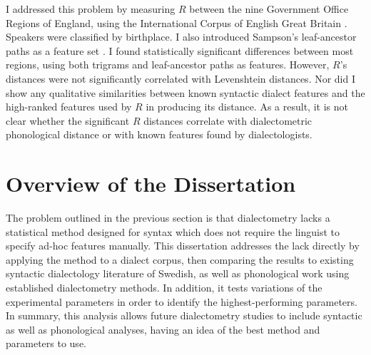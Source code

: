 I addressed this problem \cite{sanders08b} by measuring $R$ between
the nine Government Office Regions of England, using the International
Corpus of English Great Britain \cite{nelson02}. Speakers were classified by
birthplace. I also introduced Sampson's leaf-ancestor paths as
a feature set \cite{sampson00}. I found statistically
significant differences between most regions, using both trigrams and
leaf-ancestor paths as features. However, $R$'s distances were not
significantly correlated with Levenshtein distances. Nor did I
show any qualitative similarities between known syntactic dialect
features and the high-ranked features used by $R$ in producing its
distance. As a result, it is not clear whether the significant $R$ distances
correlate with dialectometric phonological distance or with known
features found by dialectologists.





\section{Overview of the Dissertation}

The problem outlined in the previous section is that dialectometry
lacks a statistical method designed for syntax which does not require
the linguist to specify ad-hoc features manually. This dissertation
addresses the lack directly by applying the method to a dialect
corpus, then comparing the results to existing syntactic dialectology
literature of Swedish, as well as phonological work using established
dialectometry methods. In addition, it tests variations of the
experimental parameters in order to identify the highest-performing
parameters. In summary, this analysis allows future dialectometry
studies to include syntactic as well as phonological analyses, having
an idea of the best method and parameters to use.

